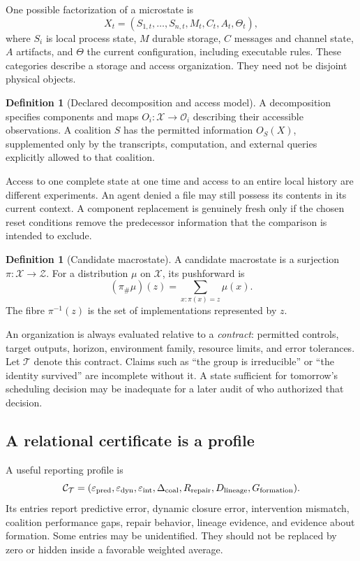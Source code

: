 \documentclass[11pt,letterpaper]{article}
\theoremstyle{plain}
\theoremstyle{definition}
\newtheorem{definition}[proposition]{Definition}
\theoremstyle{remark}
\newcommand{\X}{\mathcal X}
\newcommand{\Z}{\mathcal Z}
\newcommand{\push}{\pi_{\#}}
\begin{document}
One possible factorization of a microstate is
\[
X_t=(S_{1,t},\ldots,S_{n,t},M_t,C_t,A_t,\Theta_t),
\]
where $S_i$ is local process state, $M$ durable storage, $C$ messages and channel state, $A$ artifacts, and $\Theta$ the current configuration, including executable rules. These categories describe a storage and access organization. They need not be disjoint physical objects.

\begin{definition}[Declared decomposition and access model]\label{def:access}
A decomposition specifies components and maps $O_i:\X\to\mathcal O_i$ describing their accessible observations. A coalition $S$ has the permitted information $O_S(X)$, supplemented only by the transcripts, computation, and external queries explicitly allowed to that coalition.
\end{definition}

Access to one complete state at one time and access to an entire local history are different experiments. An agent denied a file may still possess its contents in its current context. A component replacement is genuinely fresh only if the chosen reset conditions remove the predecessor information that the comparison is intended to exclude.

\begin{definition}[Candidate macrostate]\label{def:macrostate}
A candidate macrostate is a surjection $\pi:\X\to\Z$. For a distribution $\mu$ on $\X$, its pushforward is
\[
(\push\mu)(z)=\sum_{x:\pi(x)=z}\mu(x).
\]
The fibre $\pi^{-1}(z)$ is the set of implementations represented by $z$.
\end{definition}

An organization is always evaluated relative to a \emph{contract}: permitted controls, target outputs, horizon, environment family, resource limits, and error tolerances. Let $\mathcal T$ denote this contract. Claims such as ``the group is irreducible'' or ``the identity survived'' are incomplete without it. A state sufficient for tomorrow's scheduling decision may be inadequate for a later audit of who authorized that decision.

\subsection{A relational certificate is a profile}
A useful reporting profile is
\[
\mathcal C_{\mathcal T}=(\varepsilon_{\rm pred},\varepsilon_{\rm dyn},\varepsilon_{\rm int},
\Delta_{\rm coal},R_{\rm repair},D_{\rm lineage},G_{\rm formation}).
\]
Its entries report predictive error, dynamic closure error, intervention mismatch, coalition performance gaps, repair behavior, lineage evidence, and evidence about formation. Some entries may be unidentified. They should not be replaced by zero or hidden inside a favorable weighted average.
\end{document}
